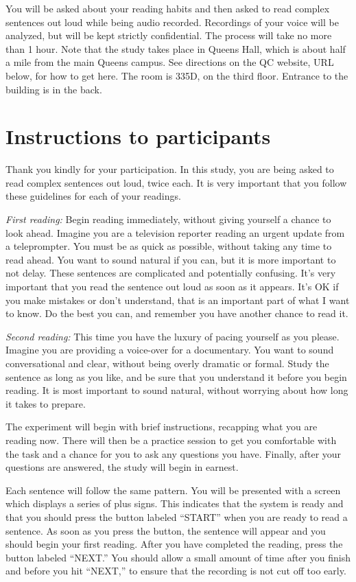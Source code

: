 \documentclass[11pt,oneside]{book}
\begin{document}
You will be asked about your reading habits and then asked to read complex sentences out loud while being audio recorded. Recordings of your voice will be analyzed, but will be kept strictly confidential. The process will take no more than 1 hour. Note that the study takes place in Queens Hall, which is about half a mile from the main Queens campus. See directions on the QC website, URL below, for how to get here. The room is 335D, on the third floor. Entrance to the building is in the back.

\newpage

\hypertarget{instr}{%
\chapter{Instructions to participants}\label{instr}}

Thank you kindly for your participation. In this study, you are being asked to read complex sentences out loud, twice each. It is very important that you follow these guidelines for each of your readings.

\emph{First reading:} Begin reading immediately, without giving yourself a chance to look ahead. Imagine you are a television reporter reading an urgent update from a teleprompter. You must be as quick as possible, without taking any time to read ahead. You want to sound natural if you can, but it is more important to not delay. These sentences are complicated and potentially confusing. It's very important that you read the sentence out loud as soon as it appears. It's OK if you make mistakes or don't understand, that is an important part of what I want to know. Do the best you can, and remember you have another chance to read it.

\emph{Second reading:} This time you have the luxury of pacing yourself as you please. Imagine you are providing a voice-over for a documentary. You want to sound conversational and clear, without being overly dramatic or formal. Study the sentence as long as you like, and be sure that you understand it before you begin reading. It is most important to sound natural, without worrying about how long it takes to prepare.

The experiment will begin with brief instructions, recapping what you are reading now. There will then be a practice session to get you comfortable with the task and a chance for you to ask any questions you have. Finally, after your questions are answered, the study will begin in earnest.

Each sentence will follow the same pattern. You will be presented with a screen which displays a series of plus signs. This indicates that the system is ready and that you should press the button labeled ``START'' when you are ready to read a sentence. As soon as you press the button, the sentence will appear and you should begin your first reading. After you have completed the reading, press the button labeled ``NEXT.'' You should allow a small amount of time after you finish and before you hit ``NEXT,'' to ensure that the recording is not cut off too early.
\end{document}
